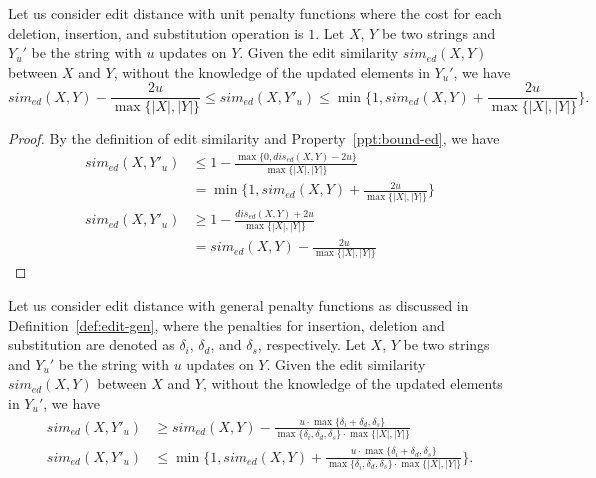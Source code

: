 \begin{property}\label{ppt:bound-es}

Let us consider edit distance with unit penalty functions where the cost for each deletion, insertion, and substitution operation is $1$. Let $X$, $Y$ be two strings and $Y_u'$ be the string with $u$ updates on $Y$. Given the edit similarity $sim_{ed}(X, Y)$ between $X$ and $Y$, without the knowledge of the updated elements in $Y_u'$, we have 
$$sim_{ed}(X, Y)-\frac{2u}{\max\{|X|, |Y|\}} \leq sim_{ed}(X, Y'_u) \leq \min\{1, sim_{ed}(X,Y)+\frac{2u}{\max\{|X|, |Y|\}}\}.$$
\end{property}

\begin{proof}
By the definition of edit similarity and Property~\ref{ppt:bound-ed}, we have 
\begin{align*} 
sim_{ed}(X, Y'_u) &\leq 1 - \frac{\max\{0, dis_{ed}(X, Y) - 2u\}}{\max\{|X|, |Y|\}}\\
&=\min\{1, sim_{ed}(X,Y)+\frac{2u}{\max\{|X|, |Y|\}}\}\\
sim_{ed}(X, Y'_u) &\geq 1 - \frac{dis_{ed}(X, Y) + 2u}{\max\{|X|, |Y|\}}\\
&= sim_{ed}(X, Y)-\frac{2u}{\max\{|X|, |Y|\}}
\end{align*}
\end{proof}

\begin{property}\label{ppt:bound-es-gen}

Let us consider edit distance with general penalty functions as discussed in Definition~\ref{def:edit-gen}, where the penalties for insertion, deletion and substitution are denoted as $\delta_i$, $\delta_d$, and $\delta_s$, respectively.  Let $X$, $Y$ be two strings and $Y_u'$ be the string with $u$ updates on $Y$.  Given the edit similarity $sim_{ed}(X, Y)$ between $X$ and $Y$, without the knowledge of the updated elements in $Y_u'$, we have 
\begin{align}
sim_{ed}(X, Y'_u) &\geq sim_{ed}(X, Y)-\frac{u\cdot \max\{\delta_i + \delta_d, \delta_s\}}{\max\{\delta_i, \delta_d, \delta_s\} \cdot \max\{|X|, |Y|\}}\\
sim_{ed}(X, Y'_u) &\leq \min\{1, sim_{ed}(X,Y)+\frac{u \cdot \max\{\delta_i + \delta_d, \delta_s\}}{\max\{\delta_i, \delta_d, \delta_s\} \cdot \max\{|X|, |Y|\}}\}.
\end{align}
\end{property}

